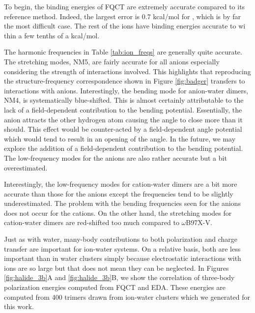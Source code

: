 \documentclass[journal=jctcce,manuscript=article]{achemso}
\begin{document}
To begin, the binding energies of FQCT are extremely accurate compared to its reference method. Indeed, the largest error is 0.7 kcal/mol for , which is by far the most difficult case. The rest of the ions have binding energies accurate to wi
thin a few tenths of a kcal/mol.

The harmonic frequencies in Table \ref{tab:ion_freqs} are generally quite accurate. The  stretching modes, NM5, are fairly accurate for all anions especially considering the strength of interactions involved. This highlights that reproducing the structure-frequency correspondence shown in Figure \ref{fig:badger} transfers to interactions with anions. Interestingly, the bending mode for anion-water dimers, NM4, is systematically blue-shifted. This is almost certainly attributable to the lack of a field-dependent contribution to the bending potential. Essentially, the anion attracts the other hydrogen atom causing the  angle to close more than it should. This effect would be counter-acted by a field-dependent angle potential which would tend to result in an opening of the  angle. In the future, we may explore the addition of a field-dependent contribution to the bending potential. The low-frequency modes for the anions are also rather accurate but a bit overestimated.

Interestingly, the low-frequency modes for cation-water dimers are a bit more accurate than those for the anions except the frequencies tend to be slightly underestimated. The problem with the bending frequencies seen for the anions does not occur for the cations. On the other hand, the  stretching modes for cation-water dimers are red-shifted too much compared to $\omega$B97X-V.

Just as with water, many-body contributions to both polarization and charge transfer are important for ion-water systems. On a relative basis, both are less important than in water clusters simply because electrostatic interactions with ions are so large but that does not mean they can be neglected. In Figures \ref{fig:halide_3b}A and \ref{fig:halide_3b}B, we show the correlation of three-body polarization energies computed from FQCT and EDA. These energies are computed from 400 trimers drawn from ion-water clusters which we generated for this work.
\end{document}
